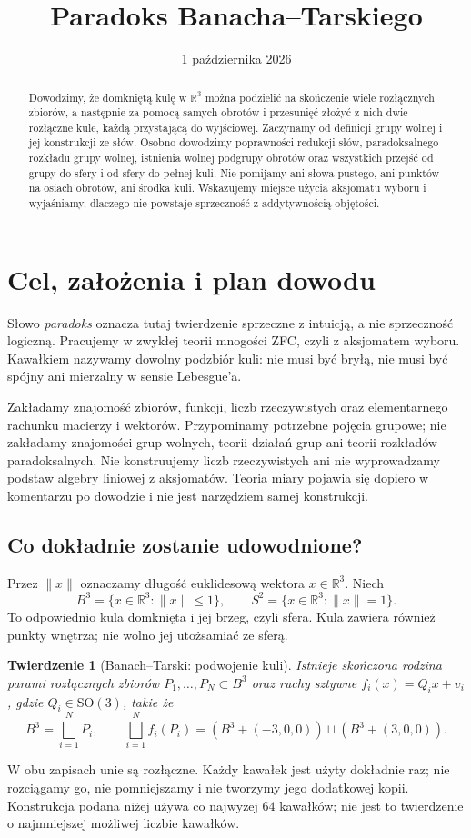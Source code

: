 \documentclass[11pt,a4paper]{article}
\title{Paradoks Banacha--Tarskiego}
\author{}
\date{1 października 2026}
\numberwithin{equation}{section}
\theoremstyle{plain}
\newtheorem{twierdzenie}{Twierdzenie}[section]
\theoremstyle{definition}
\theoremstyle{remark}
\newcommand{\R}{\mathbb R}
\begin{document}
\maketitle
\begin{abstract}
Dowodzimy, że domkniętą kulę w $\R^3$ można podzielić na skończenie wiele rozłącznych zbiorów, a następnie za pomocą samych obrotów i przesunięć złożyć z nich dwie rozłączne kule, każdą przystającą do wyjściowej. Zaczynamy od definicji grupy wolnej i jej konstrukcji ze słów. Osobno dowodzimy poprawności redukcji słów, paradoksalnego rozkładu grupy wolnej, istnienia wolnej podgrupy obrotów oraz wszystkich przejść od grupy do sfery i od sfery do pełnej kuli. Nie pomijamy ani słowa pustego, ani punktów na osiach obrotów, ani środka kuli. Wskazujemy miejsce użycia aksjomatu wyboru i wyjaśniamy, dlaczego nie powstaje sprzeczność z addytywnością objętości.
\end{abstract}
\tableofcontents

\section{Cel, założenia i plan dowodu}
Słowo \emph{paradoks} oznacza tutaj twierdzenie sprzeczne z intuicją, a nie sprzeczność logiczną. Pracujemy w zwykłej teorii mnogości ZFC, czyli z aksjomatem wyboru. Kawałkiem nazywamy dowolny podzbiór kuli: nie musi być bryłą, nie musi być spójny ani mierzalny w sensie Lebesgue'a.

Zakładamy znajomość zbiorów, funkcji, liczb rzeczywistych oraz elementarnego rachunku macierzy i wektorów. Przypominamy potrzebne pojęcia grupowe; nie zakładamy znajomości grup wolnych, teorii działań grup ani teorii rozkładów paradoksalnych. Nie konstruujemy liczb rzeczywistych ani nie wyprowadzamy podstaw algebry liniowej z aksjomatów. Teoria miary pojawia się dopiero w komentarzu po dowodzie i nie jest narzędziem samej konstrukcji.

\subsection{Co dokładnie zostanie udowodnione?}
Przez $\|x\|$ oznaczamy długość euklidesową wektora $x\in\R^3$. Niech
\[
 B^3=\{x\in\R^3:\|x\|\le1\},\qquad S^2=\{x\in\R^3:\|x\|=1\}.
\]
To odpowiednio kula domknięta i jej brzeg, czyli sfera. Kula zawiera również punkty wnętrza; nie wolno jej utożsamiać ze sferą.

\begin{twierdzenie}[Banach--Tarski: podwojenie kuli]\label{tw:banach-tarski}
Istnieje skończona rodzina parami rozłącznych zbiorów $P_1,\ldots,P_N\subset B^3$ oraz ruchy sztywne $f_i(x)=Q_ix+v_i$, gdzie $Q_i\in\mathrm{SO}(3)$, takie że
\[
 B^3=\bigsqcup_{i=1}^{N}P_i,\qquad
 \bigsqcup_{i=1}^{N}f_i(P_i)
 =(B^3+(-3,0,0))\sqcup(B^3+(3,0,0)).
\]
\end{twierdzenie}
W obu zapisach unie są rozłączne. Każdy kawałek jest użyty dokładnie raz; nie rozciągamy go, nie pomniejszamy i nie tworzymy jego dodatkowej kopii. Konstrukcja podana niżej używa co najwyżej $64$ kawałków; nie jest to twierdzenie o najmniejszej możliwej liczbie kawałków.
\end{document}
